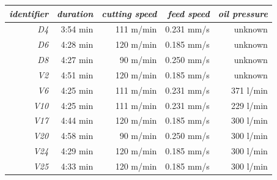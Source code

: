 \documentclass[12 pt]{scrartcl}
\begin{document}
\begin{table}[ht]
  \centering
  \label{tab:parameters}
  \begin{tabular}{r|rrrr}
    \emph{identifier} & \emph{duration} & \emph{cutting speed} & \emph{feed speed} & \emph{oil pressure} \\
    \hline
    \emph{D4}         & 3:54 min        & 111 m/min            & 0.231 mm/s        & unknown             \\
    \emph{D6}         & 4:28 min        & 120 m/min            & 0.185 mm/s        & unknown             \\
    \emph{D8}         & 4:27 min        & 90 m/min             & 0.250 mm/s        & unknown             \\
    \emph{V2}         & 4:51 min        & 120 m/min            & 0.185 mm/s        & unknown             \\
    \emph{V6}         & 4:25 min        & 111 m/min            & 0.231 mm/s        & 371 l/min           \\
    \emph{V10}        & 4:25 min        & 111 m/min            & 0.231 mm/s        & 229 l/min           \\
    \emph{V17}        & 4:44 min        & 120 m/min            & 0.185 mm/s        & 300 l/min           \\
    \emph{V20}        & 4:58 min        & 90 m/min             & 0.250 mm/s        & 300 l/min           \\
    \emph{V24}        & 4:29 min        & 120 m/min            & 0.185 mm/s        & 300 l/min           \\
    \emph{V25}        & 4:33 min        & 120 m/min            & 0.185 mm/s        & 300 l/min           \\
  \end{tabular}
\end{table}
\end{document}
